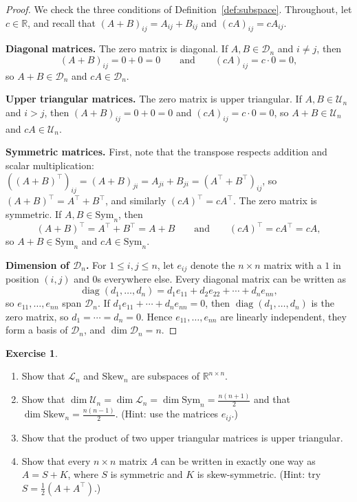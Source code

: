 \documentclass[11pt]{article}
\theoremstyle{definition}
\newtheorem{exercise}[definition]{Exercise}
\theoremstyle{plain}
\theoremstyle{remark}
\DeclareMathOperator{\diag}{diag}
\begin{document}
\begin{proof}
    We check the three conditions of Definition~\ref{def:subspace}. Throughout, let $c \in \mathbb{R}$, and recall that $(A + B)_{ij} = A_{ij} + B_{ij}$ and $(cA)_{ij} = cA_{ij}$.

    \textbf{Diagonal matrices.} The zero matrix is diagonal. If $A, B \in \mathcal{D}_n$ and $i \neq j$, then
    \[(A + B)_{ij} = 0 + 0 = 0 \qquad \text{and} \qquad (cA)_{ij} = c \cdot 0 = 0,\]
    so $A + B \in \mathcal{D}_n$ and $cA \in \mathcal{D}_n$.

    \textbf{Upper triangular matrices.} The zero matrix is upper triangular. If $A, B \in \mathcal{U}_n$ and $i > j$, then $(A + B)_{ij} = 0 + 0 = 0$ and $(cA)_{ij} = c \cdot 0 = 0$, so $A + B \in \mathcal{U}_n$ and $cA \in \mathcal{U}_n$.

    \textbf{Symmetric matrices.} First, note that the transpose respects addition and scalar multiplication: $((A + B)^\top)_{ij} = (A + B)_{ji} = A_{ji} + B_{ji} = (A^\top + B^\top)_{ij}$, so $(A + B)^\top = A^\top + B^\top$, and similarly $(cA)^\top = cA^\top$. The zero matrix is symmetric. If $A, B \in \mathrm{Sym}_n$, then
    \[(A + B)^\top = A^\top + B^\top = A + B \qquad \text{and} \qquad (cA)^\top = cA^\top = cA,\]
    so $A + B \in \mathrm{Sym}_n$ and $cA \in \mathrm{Sym}_n$.

    \textbf{Dimension of $\mathcal{D}_n$.} For $1 \leq i, j \leq n$, let $e_{ij}$ denote the $n \times n$ matrix with a $1$ in position $(i, j)$ and $0$s everywhere else. Every diagonal matrix can be written as
    \[\diag(d_1, \ldots, d_n) = d_1 e_{11} + d_2 e_{22} + \cdots + d_n e_{nn},\]
    so $e_{11}, \ldots, e_{nn}$ span $\mathcal{D}_n$. If $d_1 e_{11} + \cdots + d_n e_{nn} = 0$, then $\diag(d_1, \ldots, d_n)$ is the zero matrix, so $d_1 = \cdots = d_n = 0$. Hence $e_{11}, \ldots, e_{nn}$ are linearly independent, they form a basis of $\mathcal{D}_n$, and $\dim \mathcal{D}_n = n$.
\end{proof}

\begin{exercise}\label{exer:special}
    \begin{enumerate}
        \item Show that $\mathcal{L}_n$ and $\mathrm{Skew}_n$ are subspaces of $\mathbb{R}^{n \times n}$.
        \item Show that $\dim \mathcal{U}_n = \dim \mathcal{L}_n = \dim \mathrm{Sym}_n = \frac{n(n+1)}{2}$ and that $\dim \mathrm{Skew}_n = \frac{n(n-1)}{2}$. (Hint: use the matrices $e_{ij}$.)
        \item Show that the product of two upper triangular matrices is upper triangular.
        \item Show that every $n \times n$ matrix $A$ can be written in exactly one way as $A = S + K$, where $S$ is symmetric and $K$ is skew-symmetric. (Hint: try $S = \frac{1}{2}(A + A^\top)$.)
    \end{enumerate}
\end{exercise}
\end{document}
